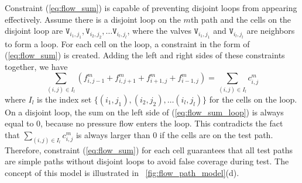 \documentclass[journal,twoside]{IEEEtran}
\begin{document}
Constraint (\ref{eq:flow_sum}) is capable of preventing disjoint loops from appearing
effectively.
Assume there is a disjoint loop on the $m$th path and the cells
on the disjoint loop are $\mathtt{V}_{i_1,j_1}, \mathtt{V}_{i_2,j_2},\dots 
\mathtt{V}_{i_l,j_l}$, where the valves 
$\mathtt{V}_{i_1,j_1}$ and $\mathtt{V}_{i_l,j_l}$ are neighbors to form a loop.
For each cell on the loop, a constraint in the form of
(\ref{eq:flow_sum}) is created. Adding the left and right sides of these constraints
together, we have
\begin{equation} 
\label{eq:flow_sum_loop} 
\sum_{(i,j)\in I_l} (f^m_{i,j-1}+ f^m_{i,j+1}+ f^m_{i+1,j}+ f^m_{i-1,j}) = 
\sum_{(i,j)\in I_l} c^m_{i,j}
\end{equation} 
where $I_l$ is the index set  $\{(i_1,j_1), (i_2,j_2), \dots (i_l,j_l)\}$ 
for the cells on the loop.
On a disjoint loop, the sum on the left
side of (\ref{eq:flow_sum_loop}) is always equal to 0, because no pressure
flow enters the loop. This contradicts 
the fact that $\sum_{(i,j)\in I_l} c^m_{i,j}$ is always larger than 0 if the
cells are on the test path.
Therefore, constraint (\ref{eq:flow_sum}) for each cell guarantees that all
test paths are simple paths without disjoint loops to avoid false coverage
during test. The concept of 
this model is illustrated in \figname~\ref{fig:flow_path_model}(d).
\end{document}
